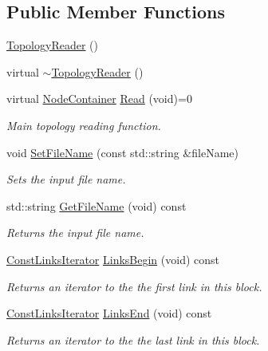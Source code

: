 \subsection*{Public Member Functions}
\begin{DoxyCompactItemize}
\item 
\hyperlink{classns3_1_1TopologyReader_aa8fde8dd942167d83215da15be1de6fc}{Topology\+Reader} ()
\item 
virtual \hyperlink{classns3_1_1TopologyReader_a273126f89ad081da78ce21afdd442dfd}{$\sim$\+Topology\+Reader} ()
\item 
virtual \hyperlink{classns3_1_1NodeContainer}{Node\+Container} \hyperlink{classns3_1_1TopologyReader_ae2a69c10e0bb66d6c850a72c6655e69c}{Read} (void)=0
\begin{DoxyCompactList}\small\item\em Main topology reading function. \end{DoxyCompactList}\item 
void \hyperlink{classns3_1_1TopologyReader_a6364c548ea978c4eda042075c99ca730}{Set\+File\+Name} (const std\+::string \&file\+Name)
\begin{DoxyCompactList}\small\item\em Sets the input file name. \end{DoxyCompactList}\item 
std\+::string \hyperlink{classns3_1_1TopologyReader_a6d417b0d32aa613887596d769aee6c5d}{Get\+File\+Name} (void) const 
\begin{DoxyCompactList}\small\item\em Returns the input file name. \end{DoxyCompactList}\item 
\hyperlink{classns3_1_1TopologyReader_a13f936af0da10bb38b80bd23048bbe20}{Const\+Links\+Iterator} \hyperlink{classns3_1_1TopologyReader_a5b102e7761470c8d798a45dff85c8396}{Links\+Begin} (void) const 
\begin{DoxyCompactList}\small\item\em Returns an iterator to the the first link in this block. \end{DoxyCompactList}\item 
\hyperlink{classns3_1_1TopologyReader_a13f936af0da10bb38b80bd23048bbe20}{Const\+Links\+Iterator} \hyperlink{classns3_1_1TopologyReader_a9169165a40b1acf2a4137b0f408fc8e6}{Links\+End} (void) const 
\begin{DoxyCompactList}\small\item\em Returns an iterator to the the last link in this block. \end{DoxyCompactList}\item 

\end{DoxyCompactItemize}
